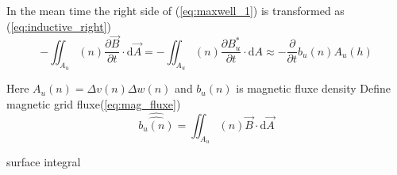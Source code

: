 In the mean time the right side of (\ref{eq:maxwell_1}) is transformed as (\ref{eq:inductive_right})
\begin{equation}
-\iint_A_{u}(n)\frac{\partial\vec{B}}{\partial t}\cdot\mathrm{d}\vec{A} 
=-\iint_A_{u}(n)\frac{\partial B^{*}_{u}}{\partial t}\cdot\mathrm{d}A
\approx -\frac{\partial}{\partial t}b_{u}(n)A_{u}(h)
\label{eq:inductive_right}
\end{equation}

Here $A_{u}(n)=\Delta v(n)\Delta w(n)$ and $b_{u}(n)$ is magnetic fluxe density
Define magnetic grid fluxe(\ref{eq:mag_fluxe})
\begin{equation}
\widehat{\widehat{b_{u}(n)}}=\iint_A_{u}(n)\vec{B}\cdot\mathrm{d}\vec{A}
\label{eq:mag_fluxe}
\end{equation}

surface integral